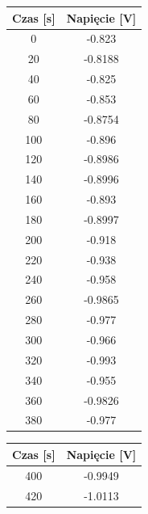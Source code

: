 \begin{multicols}{3}
    \begin{center}
        \begin{tabular}{|c|c|}
            \hline
            Czas {[}s{]} & Napięcie {[}V{]} \\ \hline \hline
            0            & -0.823           \\ \hline
            20           & -0.8188          \\ \hline
            40           & -0.825           \\ \hline
            60           & -0.853           \\ \hline
            80           & -0.8754          \\ \hline
            100          & -0.896           \\ \hline
            120          & -0.8986          \\ \hline
            140          & -0.8996          \\ \hline
            160          & -0.893           \\ \hline
            180          & -0.8997          \\ \hline
            200          & -0.918           \\ \hline
            220          & -0.938           \\ \hline
            240          & -0.958           \\ \hline
            260          & -0.9865          \\ \hline
            280          & -0.977           \\ \hline
            300          & -0.966           \\ \hline
            320          & -0.993           \\ \hline
            340          & -0.955           \\ \hline
            360          & -0.9826          \\ \hline
            380          & -0.977           \\ \hline
        \end{tabular}
        \begin{tabular}{|c|c|}
            \hline
            Czas {[}s{]} & Napięcie {[}V{]} \\ \hline \hline
            400          & -0.9949          \\ \hline
            420          & -1.0113          \\ \hline

\end{tabular}
\end{center}
\end{multicols}
